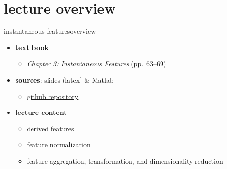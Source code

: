 

\subtitle{Part 4.3: Feature Post-Processing}


	

    \section[overview]{lecture overview}
        \begin{frame}{instantaneous features}{overview}
            \begin{itemize}
                \item   \textbf{text book}  
                    \begin{itemize}
                        \item   \href{http://ieeexplore.ieee.org/xpl/articleDetails.jsp?tp=&arnumber=6331120&}{\underline{\textit{Chapter 3: Instantaneous Features} (pp.~63--69)}}
                    \end{itemize}
                \item   \textbf{sources}: slides (latex) \& Matlab  
                    \begin{itemize}
                        \item   \href{https://github.com/alexanderlerch/ACA-Slides}{\underline{github repository}}
                    \end{itemize}
                \bigskip
                \item<2->   \textbf{lecture content}
                    \begin{itemize}
                        \item<2->   derived features
                        \item<3->   feature normalization
                        \item<4->   feature aggregation, transformation, and dimensionality reduction
                    \end{itemize}
            \end{itemize}
        \end{frame}

